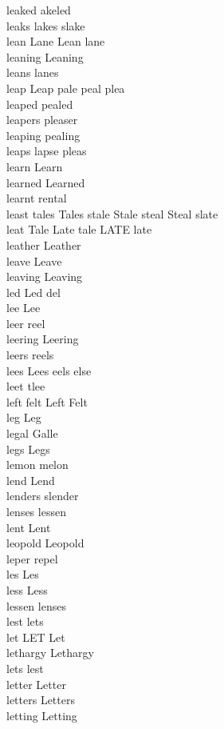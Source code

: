 leaked akeled\\
leaks lakes slake\\
lean Lane Lean lane\\
leaning Leaning\\
leans lanes\\
leap Leap pale peal plea\\
leaped pealed\\
leapers pleaser\\
leaping pealing\\
leaps lapse pleas\\
learn Learn\\
learned Learned\\
learnt rental\\
least tales Tales stale Stale steal Steal slate\\
leat Tale Late tale LATE late\\
leather Leather\\
leave Leave\\
leaving Leaving\\
led Led del\\
lee Lee\\
leer reel\\
leering Leering\\
leers reels\\
lees Lees eels else\\
leet tlee\\
left felt Left Felt\\
leg Leg\\
legal Galle\\
legs Legs\\
lemon melon\\
lend Lend\\
lenders slender\\
lenses lessen\\
lent Lent\\
leopold Leopold\\
leper repel\\
les Les\\
less Less\\
lessen lenses\\
lest lets\\
let LET Let\\
lethargy Lethargy\\
lets lest\\
letter Letter\\
letters Letters\\
letting Letting\\
